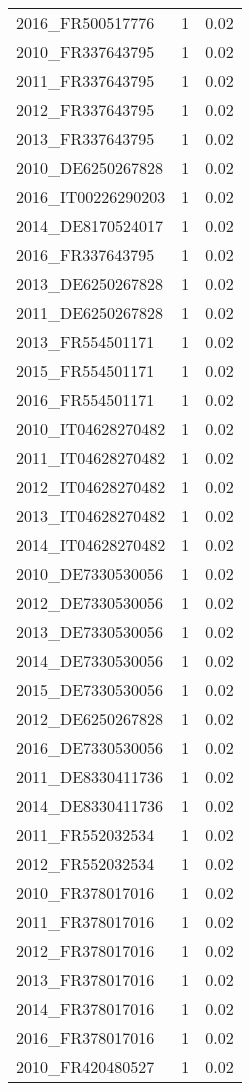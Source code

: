 \begin{table*}[htbp]
\begin{tabular}{lrr}
2016_FR500517776 & 1 & 0.02 \\
2010_FR337643795 & 1 & 0.02 \\
2011_FR337643795 & 1 & 0.02 \\
2012_FR337643795 & 1 & 0.02 \\
2013_FR337643795 & 1 & 0.02 \\
2010_DE6250267828 & 1 & 0.02 \\
2016_IT00226290203 & 1 & 0.02 \\
2014_DE8170524017 & 1 & 0.02 \\
2016_FR337643795 & 1 & 0.02 \\
2013_DE6250267828 & 1 & 0.02 \\
2011_DE6250267828 & 1 & 0.02 \\
2013_FR554501171 & 1 & 0.02 \\
2015_FR554501171 & 1 & 0.02 \\
2016_FR554501171 & 1 & 0.02 \\
2010_IT04628270482 & 1 & 0.02 \\
2011_IT04628270482 & 1 & 0.02 \\
2012_IT04628270482 & 1 & 0.02 \\
2013_IT04628270482 & 1 & 0.02 \\
2014_IT04628270482 & 1 & 0.02 \\
2010_DE7330530056 & 1 & 0.02 \\
2012_DE7330530056 & 1 & 0.02 \\
2013_DE7330530056 & 1 & 0.02 \\
2014_DE7330530056 & 1 & 0.02 \\
2015_DE7330530056 & 1 & 0.02 \\
2012_DE6250267828 & 1 & 0.02 \\
2016_DE7330530056 & 1 & 0.02 \\
2011_DE8330411736 & 1 & 0.02 \\
2014_DE8330411736 & 1 & 0.02 \\
2011_FR552032534 & 1 & 0.02 \\
2012_FR552032534 & 1 & 0.02 \\
2010_FR378017016 & 1 & 0.02 \\
2011_FR378017016 & 1 & 0.02 \\
2012_FR378017016 & 1 & 0.02 \\
2013_FR378017016 & 1 & 0.02 \\
2014_FR378017016 & 1 & 0.02 \\
2016_FR378017016 & 1 & 0.02 \\
2010_FR420480527 & 1 & 0.02 \\

\end{tabular}
\end{table*}
